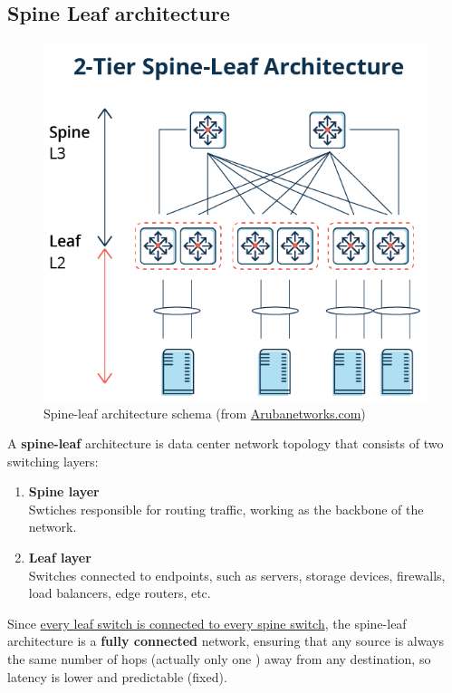 \subsection{Spine Leaf architecture}
\begin{figure}[htbp]
   \centering
   \includegraphics{images/spineleaf.png}
   \caption{Spine-leaf architecture schema (from \href{https://www.arubanetworks.com/faq/what-is-spine-leaf-architecture/}{Arubanetworks.com})}
   \label{fig:}
\end{figure}
A \textbf{spine-leaf} architecture is data center network topology that consists of two switching layers:
\begin{enumerate}
   \item \textbf{Spine layer}\\
   Swtiches responsible for routing traffic, working as the backbone of the network.   
   \item \textbf{Leaf layer}\\
   Switches connected to endpoints, such as servers, storage devices, firewalls, load balancers, edge routers, etc.
\end{enumerate}
Since \ul{every leaf switch is connected to every spine switch}, the spine-leaf architecture is a \textbf{fully connected} network,
ensuring that any source is always the same number of hops (actually only one \smiley) away from any destination, so latency is lower and predictable (fixed).

